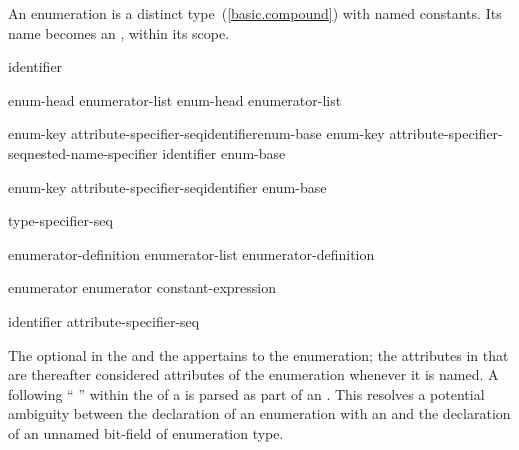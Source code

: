\pnum
An enumeration is a distinct type~(\ref{basic.compound}) with named
constants. Its name becomes an , within its scope.

\begin{bnf}
\br
    identifier
\end{bnf}

\begin{bnf}
\br
    enum-head \terminal{\{} enumerator-list\opt \terminal{\}}\br
    enum-head \terminal{\{} enumerator-list \terminal{, \}}
\end{bnf}

\begin{bnf}
\br
    enum-key attribute-specifier-seq\opt identifier\opt enum-base\opt\br
    enum-key attribute-specifier-seq\opt nested-name-specifier identifier\br
\hspace*{\bnfindentinc}enum-base\opt
\end{bnf}

\begin{bnf}
\br
    enum-key attribute-specifier-seq\opt identifier enum-base\opt \terminal{;}
\end{bnf}

\begin{bnf}
\br
    \br
    \br
\end{bnf}

\begin{bnf}
\br
    \terminal{:} type-specifier-seq
\end{bnf}

\begin{bnf}
\br
    enumerator-definition\br
    enumerator-list \terminal{,} enumerator-definition
\end{bnf}

\begin{bnf}
\br
    enumerator\br
    enumerator \terminal{=} constant-expression
\end{bnf}

\begin{bnf}
\br
    identifier attribute-specifier-seq\opt
\end{bnf}

The optional  in the  and
the  appertains to the enumeration; the attributes
in that  are thereafter considered attributes of the
enumeration whenever it is named.
A \tcode{:} following `` ''
within the  of a 
is parsed as part of an .
\enternote This resolves a potential ambiguity between the declaration of an enumeration
with an  and the declaration of an unnamed bit-field of enumeration
type. \enterexample

